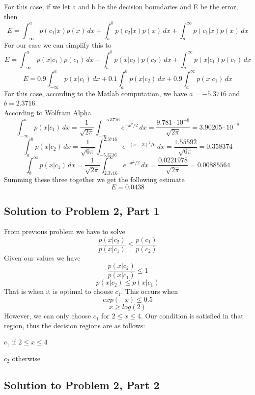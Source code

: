\documentclass[11pt,psfig]{article}
\begin{document}
For this case, if we let a and b be the decision boundaries and E be the error, then
\[
E = \int_{-\infty}^{a}{p(c_1|x)p(x) \, dx} + \int_{a}^{b}{p(c_2|x)p(x) \, dx} + \int_{a}^{\infty}{p(c_1|x)p(x) \, dx}
\]
For our case we can simplify this to
\[
E = \int_{-\infty}^{a}{p(x|c_1)p(c_1) \, dx} + \int_{a}^{b}{p(x|c_2)p(c_2) \, dx} + \int_{a}^{\infty}{p(x|c_1)p(c_1) \, dx}
\]
\[
E = 0.9\int_{-\infty}^{a}{p(x|c_1) \, dx} + 0.1\int_{a}^{b}{p(x|c_2) \, dx} + 0.9\int_{a}^{\infty}{p(x|c_1) \, dx}
\]
For this case, according to the Matlab computation, we have $a=-5.3716$ and $b=2.3716$. \\
According to Wolfram Alpha
\[
\int_{-\infty}^{a}{p(x|c_1) \, dx} = \frac{1}{\sqrt{2\pi}} \int_{-\infty}^{-5.3716}{e^{-x^2/2} \, dx} = \frac{9.781 \cdot 10^{-8}}{\sqrt{2\pi}} = 3.90205 \cdot 10^{-8}
\]
\[
\int_{a}^{b}{p(x|c_2) \, dx} = \frac{1}{\sqrt{6\pi}} \int_{-5.3716}^{2.3716}{e^{-(x-3)^2/6} \, dx} = \frac{1.55592}{\sqrt{6\pi}} = 0.358374
\]
\[
\int_{b}^{\infty}{p(x|c_1) \, dx} = \frac{1}{\sqrt{2\pi}} \int_{2.3716}^{\infty}{e^{-x^2/2} \, dx} = \frac{0.0221978}{\sqrt{2\pi}} = 0.00885564
\]
Summing these three together we get the following estimate
\[
E = 0.0438
\]
		
\subsection*{Solution to Problem 2, Part 1}

From previous problem we have to solve
\[
\frac{p(x|c_2)}{p(x|c_1)} \leq \frac{p(c_1)}{p(c_2)}
\]
Given our values we have
\[
\frac{p(x|c_2)}{p(x|c_1)} \leq 1
\]
\[
p(x|c_2) \leq p(x|c_1)
\]
That is when it is optimal to choose $c_1$. This occurs when
\[
exp(-x) \leq 0.5
\]
\[
x \geq log(2)
\]
However, we can only choose $c_1$ for $2 \leq x \leq 4$. Our condition is satisfied in that region, thus the decision regions are as follows:

$c_1$ if $2 \leq x \leq 4$

$c_2$ otherwise

\subsection*{Solution to Problem 2, Part 2}
\end{document}
